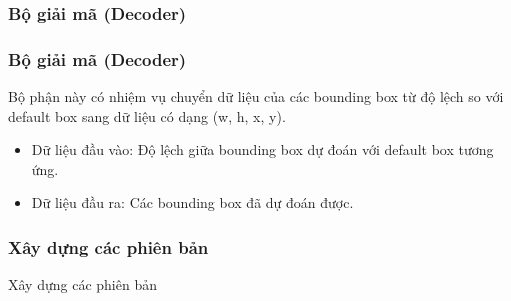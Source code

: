 \documentclass{beamer}
\begin{document}
	
	
	
	

	
	\subsubsection{Bộ giải mã (Decoder)}
	
	\begin{frame}
		\frametitle{Bộ giải mã (Decoder)}
		Bộ phận này có nhiệm vụ chuyển dữ liệu của các bounding box từ độ lệch so với default box sang dữ liệu có dạng (w, h, x, y).
		
		\begin{itemize}
			\item Dữ liệu đầu vào: Độ lệch giữa bounding box dự đoán với default box tương ứng.
			
			\item Dữ liệu đầu ra: Các bounding box đã dự đoán được.
			
		\end{itemize}
	\end{frame}
	
	
	\begin{frame}
		\frametitle{Xây dựng các phiên bản}
		{\Huge Xây dựng các phiên bản}
	\end{frame}
	
\end{document}
